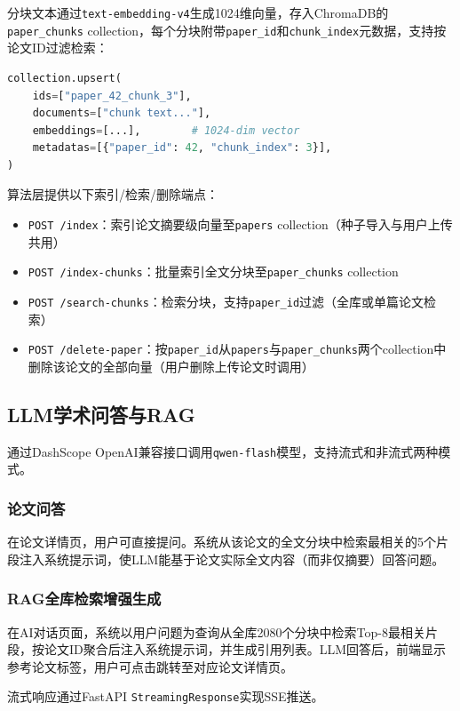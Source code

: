 \documentclass[12pt,a4paper]{ctexart}
\newcommand{\code}[1]{\texttt{#1}}
\newcommand{\api}[1]{\texttt{#1}}
\begin{document}
分块文本通过\code{text-embedding-v4}生成1024维向量，存入ChromaDB的\code{paper\_chunks} collection，每个分块附带\code{paper\_id}和\code{chunk\_index}元数据，支持按论文ID过滤检索：

\begin{lstlisting}[language=Python, caption=分块索引数据结构]
collection.upsert(
    ids=["paper_42_chunk_3"],
    documents=["chunk text..."],
    embeddings=[...],        # 1024-dim vector
    metadatas=[{"paper_id": 42, "chunk_index": 3}],
)
\end{lstlisting}

算法层提供以下索引/检索/删除端点：
\begin{itemize}
\item \api{POST /index}：索引论文摘要级向量至\code{papers} collection（种子导入与用户上传共用）
\item \api{POST /index-chunks}：批量索引全文分块至\code{paper\_chunks} collection
\item \api{POST /search-chunks}：检索分块，支持\code{paper\_id}过滤（全库或单篇论文检索）
\item \api{POST /delete-paper}：按\code{paper\_id}从\code{papers}与\code{paper\_chunks}两个collection中删除该论文的全部向量（用户删除上传论文时调用）
\end{itemize}

\subsection{LLM学术问答与RAG}

通过DashScope OpenAI兼容接口调用\code{qwen-flash}模型，支持流式和非流式两种模式。

\subsubsection{论文问答}

在论文详情页，用户可直接提问。系统从该论文的全文分块中检索最相关的5个片段注入系统提示词，使LLM能基于论文实际全文内容（而非仅摘要）回答问题。

\subsubsection{RAG全库检索增强生成}

在AI对话页面，系统以用户问题为查询从全库2080个分块中检索Top-8最相关片段，按论文ID聚合后注入系统提示词，并生成引用列表。LLM回答后，前端显示参考论文标签，用户可点击跳转至对应论文详情页。

流式响应通过FastAPI \code{StreamingResponse}实现SSE推送。
\end{document}
